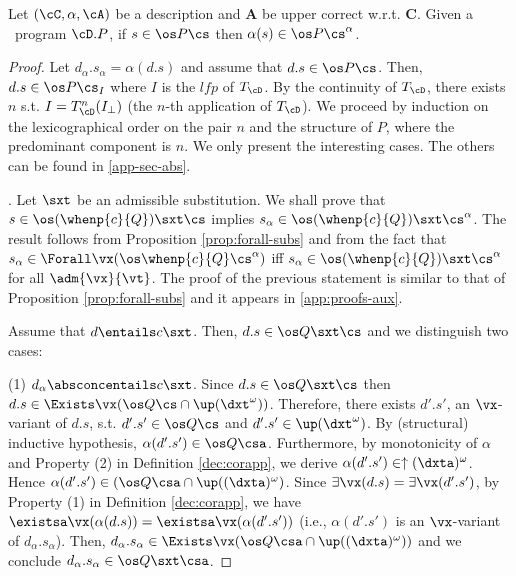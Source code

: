 \documentclass{tlp}
\begin{document}
\begin{theorem}\label{teo:corr}
Let $(\cC, \alpha, \cA )$  be a description and   ${\mathbf{A}}$  be upper correct w.r.t. $\mathbf{C}$.   Given a  \utcc\ program $\cD.P$, if 
$ s \in \os P \cs $ then  $\alpha(s) \in \os P \cs^{\alpha}$.  
\end{theorem}
\begin{proof} 
Let $d_{\alpha}.s_{\alpha} = \alpha(d.s)$ and assume that $d.s \in  \os P \cs$. Then, $d.s \in \os P\cs_I$ where $I$ is the $lfp$ of $T_{\cD}$. By the continuity of $T_{\cD}$,  there exists $n$ s.t.  $I = T_{\cD}^n(I_\bot)$ (the $n$-th application of $T_{\cD}$). 
We proceed by  induction on the lexicographical order on 
the pair $n$ and the structure of $P$, where the predominant component is  $n$. We only present the interesting cases. The others can be found in \ref{app-sec-abs}. 


. 
Let $\sxt$ be an admissible substitution.
		We shall prove that  $s \in \os (\whenp{c}{Q})\sxt\cs$ implies $s_\alpha \in \os (\whenp{c}{Q})\sxt\cs^\alpha$. 
		The result follows from Proposition 
		 \ref{prop:forall-subs}  and from the fact that 
		 $s_\alpha \in \Forall \vx(\os \whenp{c}{Q}\cs^\alpha)$ iff $s_\alpha \in \os (\whenp{c}{Q})\sxt  \cs^\alpha $ for all $\adm{\vx}{\vt}$. The proof of the previous statement is similar to that of 
		 Proposition 
		 \ref{prop:forall-subs} and it appears in   \ref{app:proofs-aux}. 

Assume that $d\entails c\sxt$. Then,   $d.s\in \os Q\sxt\cs$ and we distinguish two cases:

\noindent(1) 
$d_\alpha \absconcentails c\sxt$.
		Since $d.s\in \os Q\sxt\cs$ then 
		$d.s \in \Exists \vx (\os Q \cs \cap \up(\dxt^\omega))$. Therefore, there exists $d'.s'$, an $\vx$-variant of $d.s$, s.t.
		$d'.s'\in \os Q \cs$ and $d'.s' \in \up(\dxt^\omega)$. 
		By (structural) inductive hypothesis, $\alpha(d'.s') \in \os Q\csa$. Furthermore, by monotonicity of $\alpha$ and Property (2) in Definition \ref{dec:corapp}, we derive
		 $\alpha(d'.s') \in \uparrow (\dxta)^\omega$. Hence
		$\alpha(d'.s') \in  (\os Q \csa \cap \up((\dxta)^\omega)$. Since $\exists \vx(d.s) = \exists \vx(d'.s')$, 
		by Property (1) in Definition \ref{dec:corapp}, we have $\existsa \vx(\alpha(d.s)) = \existsa \vx(\alpha(d'.s'))$ (i.e., $\alpha(d'.s')$ is an $\vx$-variant of $d_\alpha.s_\alpha$).
		Then, $d_\alpha.s_\alpha \in  \Exists \vx (\os Q\csa \cap \up((\dxta)^\omega))$ and we conclude  $d_\alpha.s_\alpha \in \os Q\sxt\csa$. 
		

\end{proof}
\end{document}
